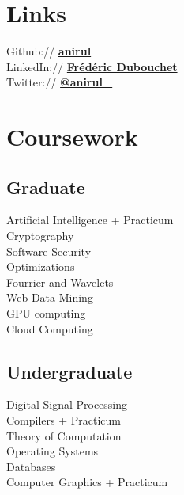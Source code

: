 \documentclass[a4paper]{deedy-resume} %
\begin{document}
\begin{minipage}[t]{0.33\textwidth}
\section{Links}

Github:// \href{https://github.com/anirul}{\bf anirul} \\
LinkedIn:// \href{http://ch.linkedin.com/pub/fr%C3%A9d%C3%A9ric-dubouchet/}{\bf Frédéric Dubouchet} \\
Twitter:// \href{https://twitter.com/anirul_}{\bf @anirul\_} \\

\sectionspace %


\section{Coursework}

\subsection{Graduate}

Artificial Intelligence + Practicum \\
Cryptography \\
Software Security \\
Optimizations \\
Fourrier and Wavelets \\
Web Data Mining \\
GPU computing \\
Cloud Computing

\sectionspace %


\subsection{Undergraduate}

Digital Signal Processing \\
Compilers + Practicum \\
Theory of Computation \\
Operating Systems \\
Databases \\
Computer Graphics + Practicum

\sectionspace %


\end{minipage}
\end{document}
